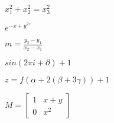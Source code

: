 \documentclass{article}
\begin{document}
\vspace{1pt}

$x_{1}^{2}+x_{2}^{2}=x_{3}^{2}$

\vspace{1pt}

$e^{-x+y^{2z}}$

$m=\frac{y_{2}-y_{1}}{x_{2}-x_{1}}$

\vspace{1pt}

$sin(2\pi i+\partial )+1$

\vspace{1pt}

$z=f(\alpha +2(\beta +3\gamma ))+1$

\vspace{1pt}

$M=\left[ 
\begin{array}{cc}
1 & x+y \\ 
0 & x^{2}%
\end{array}%
\right] $
\end{document}
